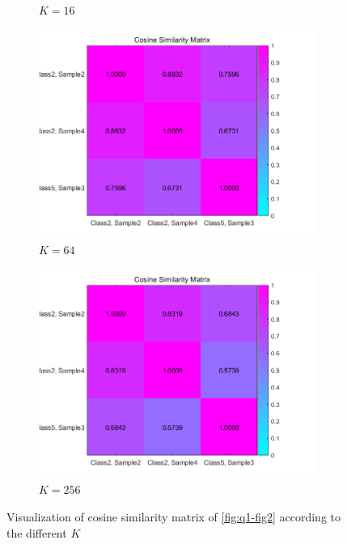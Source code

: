 \begin{figure}[htbp]
\begin{subfigure}[t]{0.25\linewidth}
		\caption{$K=16$}
	\end{subfigure}%
	\hfill
	\begin{subfigure}[t]{0.25\linewidth}
		\centering
		\includegraphics[width=\linewidth]{image/q1-appendix/similarity_64.png} 
		\caption{$K=64$}
	\end{subfigure}%
	\hfill
	\begin{subfigure}[t]{0.25\linewidth}
		\centering
		\includegraphics[width=\linewidth]{image/q1-appendix/similarity_256.png} 
		\caption{$K=256$}
	\end{subfigure}%
	\caption{Visualization of cosine similarity matrix of \cref{fig:q1-fig2} according to the different $K$}
	\label{fig:q1_cossim}
\end{figure}

